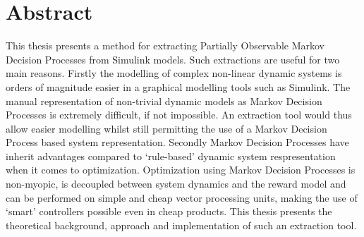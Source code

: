 \chapter*{Abstract}


This thesis presents a method for extracting Partially Observable Markov Decision Processes from Simulink models. Such extractions are useful for two main reasons. Firstly the modelling of complex non-linear dynamic systems is orders of magnitude easier in a graphical modelling tools such as Simulink. The manual representation of non-trivial dynamic models as Markov Decision Processes is extremely difficult, if not impossible. An extraction tool would thus allow  easier modelling whilst still permitting the use of a Markov Decision Process based system representation. Secondly Markov Decision Processes have inherit advantages compared to `rule-based' dynamic system respresentation when it comes to optimization. Optimization using Markov Decision Processes is non-myopic, is decoupled between system dynamics and the reward model and can be performed on simple and cheap vector processing units, making the use of `smart' controllers possible even in cheap products. This thesis presents the theoretical background, approach and implementation of such an extraction tool.

%
%
